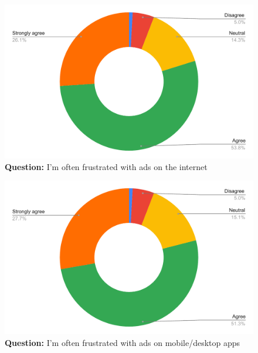\begin{figure}[H]
  \centering
  \includegraphics[width=13cm]{thesis/paper/images/p1_q5.pdf}
  \textbf{Question:} I'm often frustrated with ads on the internet
\end{figure}

\begin{figure}[H]
  \centering
  \includegraphics[width=13cm]{thesis/paper/images/p1_q6.pdf}
  \textbf{Question:} I'm often frustrated with ads on mobile/desktop apps
\end{figure}